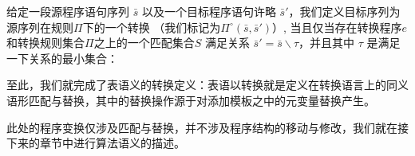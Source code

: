 \begin{definition}[表语义转换]
  给定一段源程序语句序列 $\bar{s}$ 以及一个目标程序语句许略 $\bar{s}'$，我们定义目标序列为源序列在规则$\Pi$下的一个转换
  （我们标记为$\Pi^\circ(\bar{s}, \bar{s}')$）, 当且仅当存在转换程序$e$和转换规则集合$\Pi$之上的一个匹配集合$S$ 满足关系 $\bar{s}'=\bar{s}\backslash \tau$，并且其中 $\tau$ 是满足一下关系的最小集合：
\begin{center}\small
{}
\DP
\end{center}
\begin{center}\footnotesize
  \UIC{$[\CC_1\mapsto \CC_1']\in \tau, \ldots, [\CC_n\mapsto \CC_n'] \in \tau$}
  \DP
\end{center}
\end{definition}

至此，我们就完成了表语义的转换定义：表语以转换就是定义在转换语言上的同义语形匹配与替换，其中的替换操作源于对添加模板之中的元变量替换产生。

此处的程序变换仅涉及匹配与替换，并不涉及程序结构的移动与修改，我们就在接下来的章节中进行算法语义的描述。